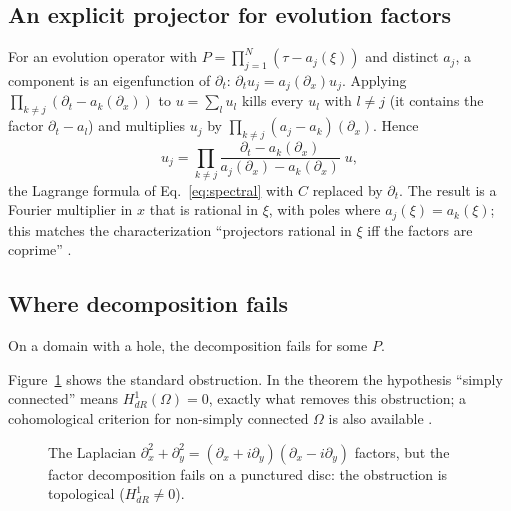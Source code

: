 \subsection{An explicit projector for evolution factors}
For an evolution operator with $P=\prod_{j=1}^N(\tau-a_j(\xi))$ and distinct $a_j$, a component is an eigenfunction of $\partial_t$: $\partial_tu_j=a_j(\partial_x)u_j$. Applying $\prod_{k\ne j}(\partial_t-a_k(\partial_x))$ to $u=\sum_lu_l$ kills every $u_l$ with $l\ne j$ (it contains the factor $\partial_t-a_l$) and multiplies $u_j$ by $\prod_{k\ne j}(a_j-a_k)(\partial_x)$. Hence
\begin{equation}\label{xeq:lagrange}
u_j=\prod_{k\ne j}\frac{\partial_t-a_k(\partial_x)}{a_j(\partial_x)-a_k(\partial_x)}\;u ,
\end{equation}
the Lagrange formula of Eq.~\eqref{eq:spectral} with $C$ replaced by $\partial_t$. The result is a Fourier multiplier in $x$ that is rational in $\xi$, with poles where $a_j(\xi)=a_k(\xi)$; this matches the characterization ``projectors rational in $\xi$ iff the factors are coprime'' .

\subsection{Where decomposition fails}
\begin{proposition}\label{prop:holes}
On a domain with a hole, the decomposition fails for some $P$.
\end{proposition}
Figure~\ref{fig:hole} shows the standard obstruction. In the theorem the hypothesis ``simply connected'' means $H^1_{dR}(\Omega)=0$, exactly what removes this obstruction; a cohomological criterion for non-simply connected $\Omega$ is also available .
\begin{figure}[!htb]
\centering
{}
\caption{The Laplacian $\partial_x^2+\partial_y^2=(\partial_x+i\partial_y)(\partial_x-i\partial_y)$ factors, but the factor decomposition fails on a punctured disc: the obstruction is topological ($H^1_{dR}\neq0$).}\label{fig:hole}
\end{figure}

